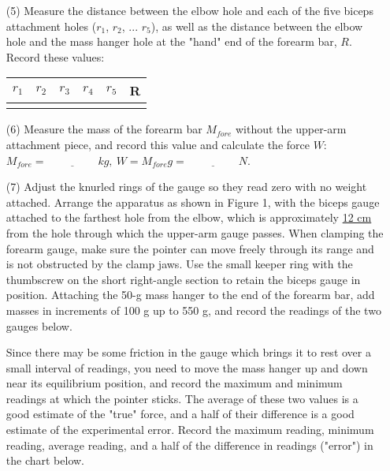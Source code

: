\documentclass{article}
\begin{document}
\begin{enumerate}


\item[(5)] Measure the distance between the elbow hole and each of the five biceps attachment holes ($r_{1}$, $r_{2}$, ... $r_{5}$), as well as the distance between the elbow hole and the mass hanger hole at the "hand" end of the forearm bar, $R$. Record these values:\\
\begin{tabular}{|c|c|c|c|c|c|}
\hline
$r_{1}$ & $r_{2}$ & $r_{3}$ & $r_{4}$ & $r_{5}$ & R\\
\hline
  &  &  &  & & \\
\hline
\end{tabular}


\item[(6)] Measure the mass of the forearm bar $M_{fore}$ without the upper-arm attachment piece, and record this value and calculate the force $W$: $M_{fore}=\underline{~~~~~~~~~~~~~~~~~~~~~}kg,~W=M_{fore}g=\underline{~~~~~~~~~~~~~~~~~~~~~}N$.

\item[(7)] Adjust the knurled rings of the gauge so they read zero with no weight attached. Arrange the apparatus as shown in Figure 1, with the biceps gauge attached to the farthest hole from the elbow, which is approximately \underline{12 cm} from the hole through which the upper-arm gauge passes. When clamping the forearm gauge, make sure the pointer can move freely through its range and is not obstructed by the clamp jaws. Use the small keeper ring with the thumbscrew on the short right-angle section to retain the biceps gauge in position. Attaching the 50-g mass hanger to the end of the forearm bar, add masses in increments of 100 g up to 550 g, and record the readings of the two gauges below. 

Since there may be some friction in the gauge which brings it to rest over a small interval of readings, you need to move the mass hanger up and down near its equilibrium position, and record the maximum and minimum readings at which the pointer sticks. The average of these two values is a good estimate of the "true" force, and a half of their difference is a good estimate of the experimental error. Record the maximum reading, minimum reading, average reading, and a half of the difference in readings ("error") in the chart below. 


\end{enumerate}
\end{document}
